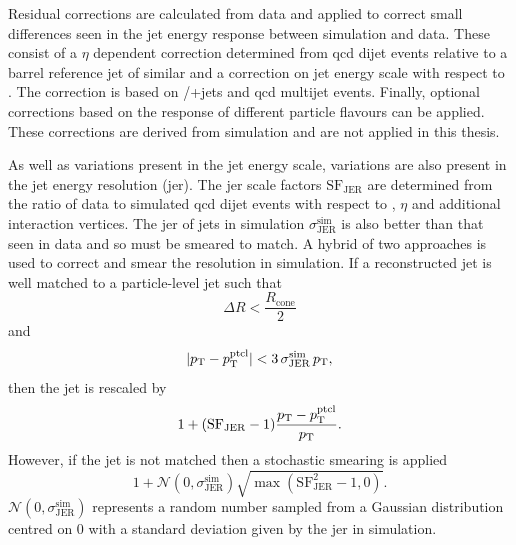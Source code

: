 Residual corrections are calculated from data and applied to correct small differences seen in the jet energy response between simulation and data.
These consist of a $\eta$ dependent correction determined from \acrshort{qcd} dijet events relative to a barrel reference jet of similar \pt{} and a correction on jet energy scale with respect to \pt{}.
The \pt{} correction is based on \Zboson/\photon{}+jets and \acrshort{qcd} multijet events. 
Finally, optional corrections based on the response of different particle flavours can be applied.
These corrections are derived from simulation and are not applied in this thesis.

As well as variations present in the jet energy scale, variations are also present in the jet energy resolution (\acrshort{jer}).
The \acrshort{jer} scale factors $\mathrm{SF}_{\mathrm{JER}}$ are determined from the ratio of data to simulated \acrshort{qcd} dijet events with respect to \pt{}, $\eta$ and additional interaction vertices.
The \acrshort{jer} of jets in simulation $\sigma_\mathrm{JER}^{\mathrm{sim}}$ is also better than that seen in data and so must be smeared to match.
A hybrid of two approaches is used to correct and smear the resolution in simulation.
If a reconstructed jet is well matched to a particle-level jet such that 
\begin{equation*}
	\Delta R < \frac{R_\mathrm{cone}}{2}
\end{equation*}
and 
\begin{equation}
	\lvert p_{\mathrm{T}} - p_{\mathrm{T}}^\mathrm{ptcl} \rvert < 3\,\sigma_\mathrm{JER}^{\mathrm{sim}}\,p_{\mathrm{T}},
\end{equation}
 then the jet \pt{} is rescaled by
\begin{equation*}
	1+(\mathrm{SF}_{\mathrm{JER}}-1)\frac{p_{\mathrm{T}}-p_{\mathrm{T}}^{\mathrm{ptcl}}}{p_{\mathrm{T}}}.
\end{equation*}
However, if the jet is not matched then a stochastic smearing is applied
\begin{equation*}
	1 + \mathcal N(0,\sigma_\mathrm{JER}^{\mathrm{sim}}) \sqrt{\max(\mathrm{SF}_{\mathrm{JER}}^2 - 1, 0)}.
\end{equation*}
$\mathcal N(0,\sigma_\mathrm{JER}^{\mathrm{sim}})$ represents a random number sampled from a Gaussian distribution centred on 0 with a standard deviation given by the \acrshort{jer} in simulation.


